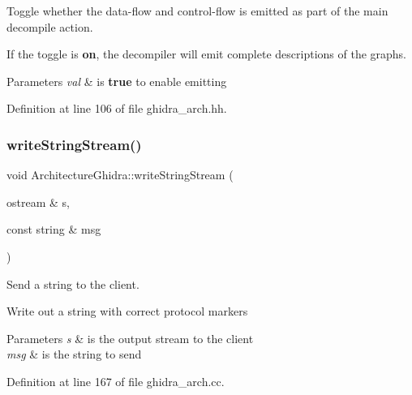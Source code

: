 Toggle whether the data-\/flow and control-\/flow is emitted as part of the main decompile action. 

If the toggle is {\bfseries{on}}, the decompiler will emit complete descriptions of the graphs. 
\begin{DoxyParams}{Parameters}
{\em val} & is {\bfseries{true}} to enable emitting \\
\hline
\end{DoxyParams}


Definition at line 106 of file ghidra\+\_\+arch.\+hh.

\mbox{\label{class_architecture_ghidra_a438f8405f19893ac1aa3057f67188f4a}} 
\subsubsection{\texorpdfstring{writeStringStream()}{writeStringStream()}}
{\footnotesize\ttfamily void Architecture\+Ghidra\+::write\+String\+Stream (\begin{DoxyParamCaption}\item[{ostream \&}]{s,  }\item[{const string \&}]{msg }\end{DoxyParamCaption})\hspace{0.3cm}{\ttfamily [static]}}



Send a string to the client. 

Write out a string with correct protocol markers 
\begin{DoxyParams}{Parameters}
{\em s} & is the output stream to the client \\
\hline
{\em msg} & is the string to send \\
\hline
\end{DoxyParams}


Definition at line 167 of file ghidra\+\_\+arch.\+cc.

